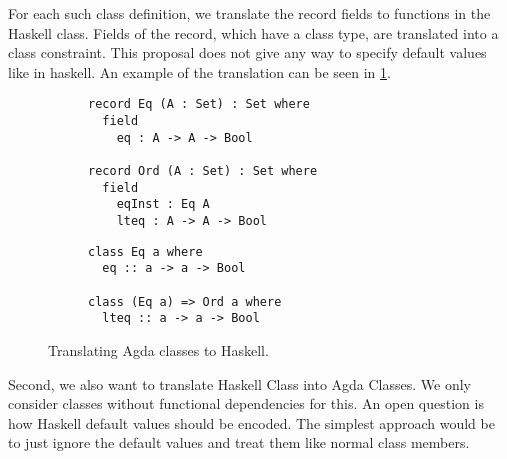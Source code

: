 \documentclass[12pt, a4paper, twoside]{report}
\begin{document}
For each such class definition, we translate the record fields to functions
in the Haskell class. Fields of the record, which have a class type, are
translated into a class constraint. This proposal does not give any way
to specify default values like in haskell. An example of the translation
can be seen in \ref{lst:cls-agda-hs}.
\begin{figure}
\begin{subfigure}[b]{0.5\textwidth}
\begin{lstlisting}
record Eq (A : Set) : Set where
  field
    eq : A -> A -> Bool

record Ord (A : Set) : Set where
  field
    eqInst : Eq A
    lteq : A -> A -> Bool
\end{lstlisting}
\end{subfigure}
\hspace{10pt}
\begin{subfigure}[b]{0.5\textwidth}
\begin{lstlisting}
class Eq a where
  eq :: a -> a -> Bool

class (Eq a) => Ord a where
  lteq :: a -> a -> Bool
\end{lstlisting}
\end{subfigure}
\caption{Translating Agda classes to Haskell.}
\label{lst:cls-agda-hs}
\end{figure}


Second, we also want to translate Haskell Class into Agda Classes. We only
consider classes without functional dependencies for this. An open question is
how Haskell default values should be encoded. The simplest approach would be
to just ignore the default values and treat them like normal class members.
\end{document}
